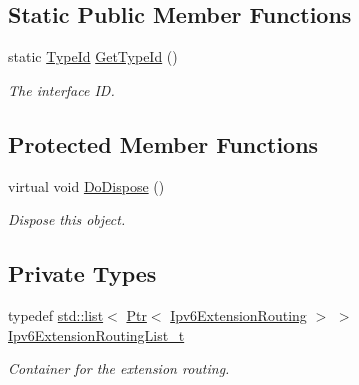 \subsection*{Static Public Member Functions}
\begin{DoxyCompactItemize}
\item 
static \hyperlink{classns3_1_1TypeId}{Type\+Id} \hyperlink{classns3_1_1Ipv6ExtensionRoutingDemux_a8e3b219552bf087162138f7b3d2084c1}{Get\+Type\+Id} ()
\begin{DoxyCompactList}\small\item\em The interface ID. \end{DoxyCompactList}\end{DoxyCompactItemize}
\subsection*{Protected Member Functions}
\begin{DoxyCompactItemize}
\item 
virtual void \hyperlink{classns3_1_1Ipv6ExtensionRoutingDemux_a0dc2c5eecbf50226fea6730ce65e9896}{Do\+Dispose} ()
\begin{DoxyCompactList}\small\item\em Dispose this object. \end{DoxyCompactList}\end{DoxyCompactItemize}
\subsection*{Private Types}
\begin{DoxyCompactItemize}
\item 
typedef \hyperlink{openflow-interface_8h_afd9bcfa176617760671b67580f536fa7}{std\+::list}$<$ \hyperlink{classns3_1_1Ptr}{Ptr}$<$ \hyperlink{classns3_1_1Ipv6ExtensionRouting}{Ipv6\+Extension\+Routing} $>$ $>$ \hyperlink{classns3_1_1Ipv6ExtensionRoutingDemux_a70982c84ce76caba8a9eb06e088bda5c}{Ipv6\+Extension\+Routing\+List\+\_\+t}
\begin{DoxyCompactList}\small\item\em Container for the extension routing. \end{DoxyCompactList}\end{DoxyCompactItemize}
